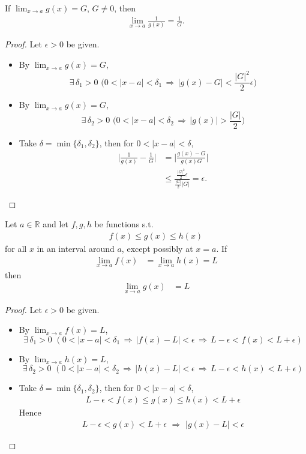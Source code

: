\begin{theorem}
If $\lim_{x\to a}g(x) = G$, $G\ne 0$, then
\begin{align*}
\lim_{x\to a}\frac{1}{g(x)} = \frac{1}{G}.
\end{align*}
\end{theorem}
\begin{proof}
Let $\epsilon > 0$ be given.
\begin{itemize}
\item By $\lim_{x\to a}g(x) = G$, $$\exists\,\delta_1 > 0\,\,\Big(0 < |x - a| < \delta_1\,\Longrightarrow\,|g(x) - G| < \frac{|G|^2}{2}\epsilon\Big)$$
\item By $\lim_{x\to a}g(x) = G$, $$\exists\,\delta_2 > 0\,\,\Big(0 < |x - a| < \delta_2\,\Longrightarrow\,|g(x)| > \frac{|G|}{2}\Big)$$
\item Take $\delta = \min\{\delta_1, \delta_2\}$, then for $ 0 < |x - a| < \delta$,
\begin{align*}
\bigg|\frac{1}{g(x)} - \frac{1}{G}\bigg| &= \bigg|\frac{g(x) - G}{g(x)G}\bigg| \\
&\leqslant \frac{\frac{|G|^2}{2}\epsilon}{\frac{|G|}{2}|G|} = \epsilon.
\end{align*}
\end{itemize}
\end{proof}
\begin{theorem} %
Let $a \in \mathbb{R}$ and let $f, g, h$ be functions s.t.%
\begin{align*}
f(x) \leqslant g(x) \leqslant h(x)
\end{align*}
for all $x$ in an interval around $a$, except possibly at $x=a$. If
\begin{align*}
\lim_{x \to a} f(x) &= \lim_{x \to a} h(x) = L
\end{align*}
then %
\begin{align*}
\lim_{x \to a} g(x) &= L
\end{align*}
\end{theorem}
\begin{proof}
Let $\epsilon > 0$ be given.
\begin{itemize}
\item By $\lim_{x\to a}f(x) = L$, $$\exists\,\delta_1 > 0\,\,(0 < |x - a| < \delta_1\,\Longrightarrow\,|f(x) - L| < \epsilon\,\Longrightarrow\, L - \epsilon < f(x) < L + \epsilon)$$
\item By $\lim_{x\to a}h(x) = L$, $$\exists\,\delta_2 > 0\,\,(0 < |x - a| < \delta_2\,\Longrightarrow\,|h(x) - L| < \epsilon\,\Longrightarrow\, L - \epsilon < h(x) < L + \epsilon)$$
\item Take $\delta = \min\{\delta_1, \delta_2\}$, then for $ 0 < |x - a| < \delta$,
\begin{align*}
L - \epsilon < f(x)\leqslant g(x)\leqslant h(x) < L + \epsilon
\end{align*}
Hence
\begin{align*}
L - \epsilon < g(x) < L + \epsilon\,\,\Longrightarrow\,\,|g(x) - L| < \epsilon
\end{align*}
\end{itemize}
\end{proof}
